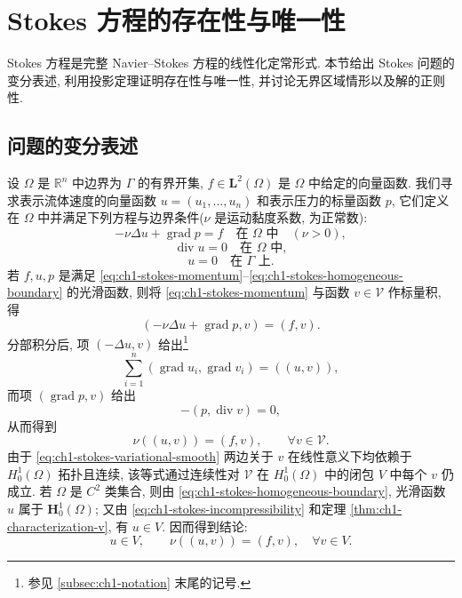 \clearpage
\section{Stokes 方程的存在性与唯一性}
\label{sec:ch1-stokes-existence-uniqueness}

Stokes 方程是完整 Navier--Stokes 方程的线性化定常形式. 本节给出 Stokes 问题的变分表述, 利用投影定理证明存在性与唯一性, 并讨论无界区域情形以及解的正则性.

\subsection{问题的变分表述}
\label{subsec:ch1-stokes-variational-formulation}

设 $\Omega$ 是 $\mathbb R^n$ 中边界为 $\Gamma$ 的有界开集, $f\in\mathbf L^2(\Omega)$ 是 $\Omega$ 中给定的向量函数. 我们寻求表示流体速度的向量函数 $u=(u_1,\ldots,u_n)$ 和表示压力的标量函数 $p$, 它们定义在 $\Omega$ 中并满足下列方程与边界条件($\nu$ 是运动黏度系数, 为正常数):
\begin{equation}
-\nu\Delta u+\operatorname{grad}p=f\quad\text{在 }\Omega\text{ 中}\quad(\nu>0),
\label{eq:ch1-stokes-momentum}
\end{equation}
\begin{equation}
\operatorname{div}u=0\quad\text{在 }\Omega\text{ 中},
\label{eq:ch1-stokes-incompressibility}
\end{equation}
\begin{equation}
u=0\quad\text{在 }\Gamma\text{ 上}.
\label{eq:ch1-stokes-homogeneous-boundary}
\end{equation}
若 $f,u,p$ 是满足 \eqref{eq:ch1-stokes-momentum}--\eqref{eq:ch1-stokes-homogeneous-boundary} 的光滑函数, 则将 \eqref{eq:ch1-stokes-momentum} 与函数 $v\in\mathcal V$ 作标量积, 得
\[
(-\nu\Delta u+\operatorname{grad}p,v)=(f,v).
\]
\setcounter{footnote}{0}
分部积分后, 项 $(-\Delta u,v)$ 给出\footnote{参见 \ref{subsec:ch1-notation} 末尾的记号.}
\begin{equation}
\sum_{i=1}^n(\operatorname{grad}u_i,\operatorname{grad}v_i)=((u,v)),
\label{eq:ch1-stokes-gradient-form}
\end{equation}
而项 $(\operatorname{grad}p,v)$ 给出
\[
-(p,\operatorname{div}v)=0,
\]
从而得到
\begin{equation}
\nu((u,v))=(f,v),\qquad \forall v\in\mathcal V.
\label{eq:ch1-stokes-variational-smooth}
\end{equation}
由于 \eqref{eq:ch1-stokes-variational-smooth} 两边关于 $v$ 在线性意义下均依赖于 $H_0^1(\Omega)$ 拓扑且连续, 该等式通过连续性对 $\mathcal V$ 在 $H_0^1(\Omega)$ 中的闭包 $V$ 中每个 $v$ 仍成立. 若 $\Omega$ 是 $C^2$ 类集合, 则由 \eqref{eq:ch1-stokes-homogeneous-boundary}, 光滑函数 $u$ 属于 $\mathbf H_0^1(\Omega)$; 又由 \eqref{eq:ch1-stokes-incompressibility} 和定理 \ref{thm:ch1-characterization-v}, 有 $u\in V$. 因而得到结论:
\begin{equation}
u\in V,\qquad \nu((u,v))=(f,v),\quad\forall v\in V.
\label{eq:ch1-stokes-variational-problem}
\end{equation}

